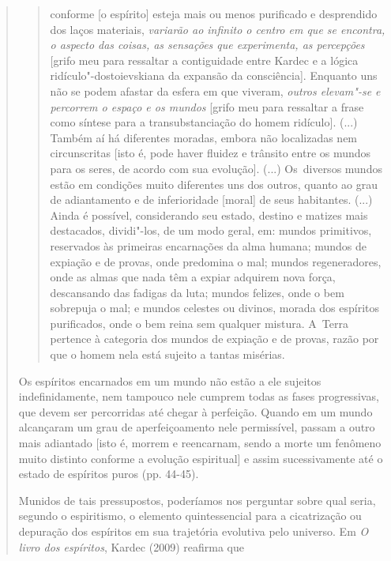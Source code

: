 {\begin{quote}
\begin{quote}
conforme {[}o espírito{]} esteja mais ou menos purificado e desprendido
dos laços materiais, \emph{variarão ao infinito o centro em que se
encontra, o aspecto das coisas, as sensações que experimenta, as
percepções} {[}grifo meu para ressaltar a contiguidade entre Kardec e a
lógica ridículo"-dostoievskiana da expansão da consciência{]}. Enquanto
uns não se podem afastar da esfera em que viveram, \emph{outros
elevam"-se e percorrem o espaço e os mundos} {[}grifo meu para ressaltar
a frase como síntese para a transubstanciação do homem ridículo{]}.
(...) Também aí há diferentes moradas, embora não localizadas nem
circunscritas {[}isto é, pode haver fluidez e trânsito entre os mundos
para os seres, de acordo com sua evolução{]}. (...) Os~diversos mundos
estão em condições muito diferentes uns dos outros, quanto ao grau de
adiantamento e de inferioridade {[}moral{]} de seus habitantes. (...)
Ainda é possível, considerando seu estado, destino e matizes mais
destacados, dividi"-los, de um modo geral, em: mundos primitivos,
reservados às primeiras encarnações da alma humana; mundos de expiação e
de provas, onde predomina o mal; mundos regeneradores, onde as almas que
nada têm a expiar adquirem nova força, descansando das fadigas da luta;
mundos felizes, onde o bem sobrepuja o mal; e mundos celestes ou
divinos, morada dos espíritos purificados, onde o bem reina sem qualquer
mistura. A~Terra pertence à categoria dos mundos de expiação e de
provas, razão por que o homem nela está sujeito a tantas misérias.
\end{quote}

Os espíritos encarnados em um mundo não estão a ele sujeitos
indefinidamente, nem tampouco nele cumprem todas as fases progressivas,
que devem ser percorridas até chegar à perfeição. Quando em um mundo
alcançaram um grau de aperfeiçoamento nele permissível, passam a outro
mais adiantado {[}isto é, morrem e reencarnam, sendo a morte um fenômeno
muito distinto conforme a evolução espiritual{]} e assim sucessivamente
até o estado de espíritos puros (pp. 44-45).

Munidos de tais pressupostos, poderíamos nos perguntar sobre qual seria,
segundo o espiritismo, o elemento quintessencial para a cicatrização ou
depuração dos espíritos em sua trajetória evolutiva pelo universo. Em
\emph{O livro dos espíritos}, Kardec (2009) reafirma que


\end{quote}}
